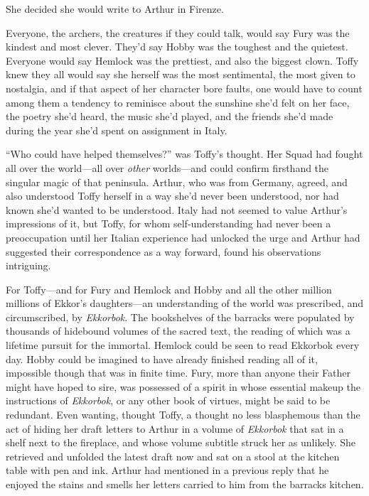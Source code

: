 \documentclass[11pt,a5paper]{article}
\begin{document}
She decided she would write to Arthur in Firenze.

Everyone, the archers, the creatures if they could talk, would say Fury was the kindest and most clever. They'd say Hobby was the toughest and the quietest. Everyone would say Hemlock was the prettiest, and also the biggest clown. Toffy knew they all would say she herself was the most sentimental, the most given to nostalgia, and if that aspect of her character bore faults, one would have to count among them a tendency to reminisce about the sunshine she'd felt on her face, the poetry she'd heard, the music she'd played, and the friends she'd made during the year she'd spent on assignment in Italy.

``Who could have helped themselves?'' was Toffy's thought. Her Squad had fought all over the world---all over \emph{other} worlds---and could confirm firsthand the singular magic of that peninsula. Arthur, who was from Germany, agreed, and also understood Toffy herself in a way she'd never been understood, nor had known she'd wanted to be understood. Italy had not seemed to value Arthur's impressions of it, but Toffy, for whom self-understanding had never been a preoccupation until her Italian experience had unlocked the urge and Arthur had suggested their correspondence as a way forward, found his observations intriguing.

For Toffy---and for Fury and Hemlock and Hobby and all the other million millions of Ekkor's daughters---an understanding of the world was prescribed, and circumscribed, by \emph{Ekkorbok}. The bookshelves of the barracks were populated by thousands of hidebound volumes of the sacred text, the reading of which was a lifetime pursuit for the immortal. Hemlock could be seen to read Ekkorbok every day. Hobby could be imagined to have already finished reading all of it, impossible though that was in finite time. Fury, more than anyone their Father might have hoped to sire, was possessed of a spirit in whose essential makeup the instructions of \emph{Ekkorbok}, or any other book of virtues, might be said to be redundant. Even wanting, thought Toffy, a thought no less blasphemous than the act of hiding her draft letters to Arthur in a volume of \emph{Ekkorbok} that sat in a shelf next to the fireplace, and whose volume subtitle struck her as unlikely. She retrieved and unfolded the latest draft now and sat on a stool at the kitchen table with pen and ink. Arthur had mentioned in a previous reply that he enjoyed the stains and smells her letters carried to him from the barracks kitchen.
\end{document}
